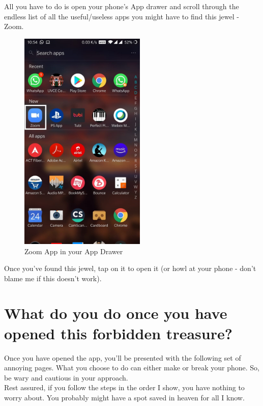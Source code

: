 \documentclass[14pt]{report}
\begin{document}
                    All you have to do is open your phone's App drawer and scroll through the endless list of all the useful/useless apps you might have to find this jewel - Zoom.\\
                    \begin{figure}[H]
						\includegraphics[width=6cm]{ZoomAppDrawer.jpeg}
						\centering
                        \caption{Zoom App in your App Drawer}
                        \label{fig:ZoomAppDrawer}
                    \end{figure}
                    
                    Once you've found this jewel, tap on it to open it (or howl at your phone - don't blame me if this doesn't work).
    \section{What do you do once you have opened this forbidden treasure?}
                    Once you have opened the app, you'll be presented with the following set of annoying pages. What you choose to do can either make or break your phone. So, be wary and cautious in your approach.\\

                    Rest assured, if you follow the steps in the order I show, you have nothing to worry about. You probably might have a spot saved in heaven for all I know.\\
\end{document}
